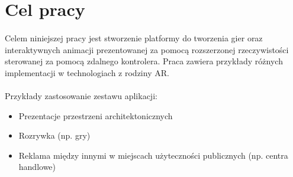 \section*{Cel pracy}
\paragraph{}
Celem niniejszej pracy jest stworzenie platformy do tworzenia gier oraz interaktywnych animacji prezentowanej za pomocą rozszerzonej rzeczywistości sterowanej za pomocą zdalnego kontrolera. Praca zawiera przykłady różnych implementacji w technologiach z rodziny AR.
\paragraph{}
Przykłady zastosowanie zestawu aplikacji:
\begin{itemize}
	\item Prezentacje przestrzeni architektonicznych
	\item Rozrywka (np. gry)
	\item Reklama między innymi w miejscach użyteczności publicznych (np. centra handlowe)
\end{itemize}